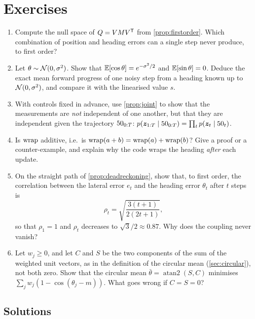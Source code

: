 \FloatBarrier
\section*{Exercises}

\begin{enumerate}[label=\textbf{1.\arabic*},ref=1.\arabic*]
\item\label{ex:nullspace} Compute the null space of $Q=VMV^{\mathsf{T}}$ from
  \cref{prop:firstorder}. Which combination of position and heading
  errors can a single step never produce, to first order?
\item\label{ex:ecos} Let $\theta\sim\mathcal{N}(0,\sigma^2)$. Show that
  $\mathbb{E}[\cos\theta]=e^{-\sigma^2/2}$ and $\mathbb{E}[\sin\theta]=0$. Deduce the
  exact mean forward progress of one noisy step from a heading known up to
  $\mathcal{N}(0,\sigma^2)$, and compare it with the linearised value $s$.
\item\label{ex:condind} With controls fixed in advance, use
  \cref{prop:joint} to show that the measurements are \emph{not}
  independent of one another, but that they
  are independent given the trajectory $50_{0:T}$: $p(\bm{z}_{1:T}\mid50_{0:T})=
  \prod_t p(\bm{z}_t\mid50_t)$.
\item\label{ex:wrapadd} Is $\operatorname{wrap}$ additive, i.e.\ is
  $\operatorname{wrap}(a+b)=\operatorname{wrap}(a)+\operatorname{wrap}(b)$? Give a proof or a counter-example, and
  explain why the code wraps the heading \emph{after} each update.
\item\label{ex:corr} On the straight path of \cref{prop:deadreckoning},
  show that, to first order, the correlation between the lateral error
  $e_t$ and the heading error $\theta_t$ after $t$ steps is
  \[
    \rho_t=\sqrt{\frac{3(t+1)}{2(2t+1)}},
  \]
  so that $\rho_1=1$ and $\rho_t$ decreases to $\sqrt3/2\approx0.87$.
  Why does the coupling never vanish?
\item\label{ex:circmean} Let $w_j\ge0$, and let $C$ and $S$ be the two
  components of the sum of the weighted unit vectors, as in the definition
  of the circular mean (\cref{sec:circular}), not both zero. Show that the
  circular mean $\bar\theta=\operatorname{atan2}(S,C)$ minimises $\sum_jw_j(1-\cos(\theta_j-m))$. What goes wrong
  if $C=S=0$?
\end{enumerate}

\subsection*{Solutions}

